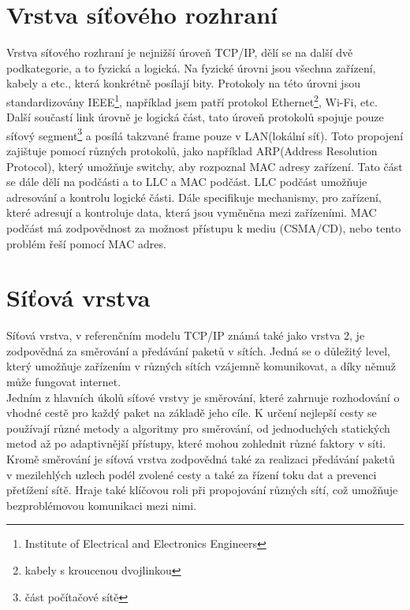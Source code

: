 \documentclass[12pt]{report}			%
\begin{document}
			\section{Vrstva síťového rozhraní}
			Vrstva síťového rozhraní je nejnižší úroveň TCP/IP, dělí se na další dvě podkategorie, a to fyzická a logická. Na fyzické úrovni jsou všechna zařízení, kabely a etc., která konkrétně posílají bity. Protokoly na této úrovni jsou standardizovány IEEE\footnote{Institute of Electrical and Electronics Engineers}, například jsem patří protokol Ethernet\footnote{kabely s kroucenou dvojlinkou}, Wi-Fi, etc.
 \\
Další součastí link úrovně je logická část, tato úroveň protokolů spojuje pouze síťový segment\footnote{část počítačové sítě} a posílá takzvané frame pouze v LAN(lokální síť). Toto propojení zajištuje pomocí různých protokolů, jako například ARP(Address Resolution Protocol), který umožňuje switchy, aby rozpoznal MAC adresy zařízení. Tato část se dále dělí na podčásti a to LLC a MAC podčást. LLC podčást umožňuje adresování a kontrolu logické části. Dále specifikuje mechanismy, pro zařízení, které adresují a kontroluje data, která jsou vyměněna mezi zařízeními. MAC podčást má zodpovědnost za možnost přístupu k mediu (CSMA/CD), nebo tento problém řeší pomocí MAC adres. 

\cite{Princip5} 
\cite{Link2} 
\cite{Link3}
 \cite{Link4}
 \cite{Link5}
 \cite{Link6}

			\section{Síťová vrstva}
Síťová vrstva, v referenčním modelu TCP/IP známá také jako vrstva 2, je zodpovědná za směrování a předávání paketů v sítích. Jedná se o důležitý level, který umožňuje zařízením v různých sítích vzájemně komunikovat, a díky němuž může fungovat internet.
\\
Jedním z hlavních úkolů síťové vrstvy je směrování, které zahrnuje rozhodování o vhodné cestě pro každý paket na základě jeho cíle. K určení nejlepší cesty se používají různé metody a algoritmy pro směrování, od jednoduchých statických metod až po adaptivnější přístupy, které mohou zohlednit různé faktory v síti.
\\
Kromě směrování je síťová vrstva zodpovědná také za realizaci předávání paketů v mezilehlých uzlech podél zvolené cesty a také za řízení toku dat a prevenci přetížení sítě. Hraje také klíčovou roli při propojování různých sítí, což umožňuje bezproblémovou komunikaci mezi nimi.
\end{document}
